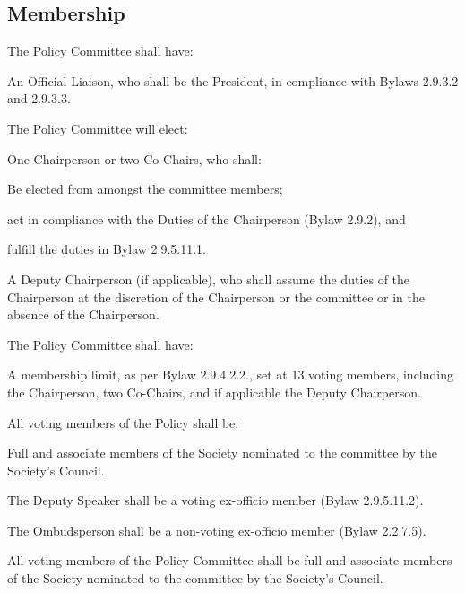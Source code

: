 \subsection{Membership}
\begin{longenum}[ label*=\thesubsection.\arabic*., align=left] 
\item The Policy Committee shall have:
	\begin{longenum}[label*=\arabic*., align=left]	
	\item An Official Liaison, who shall be the President, in compliance with Bylaws 2.9.3.2 and
2.9.3.3.
	\end{longenum}
\item The Policy Committee will elect:
	\begin{longenum}[label*=\arabic*., align=left]	
	\item One Chairperson or two Co-Chairs, who shall:
		\begin{longenum}[label*=\arabic*., align=left]	
		\item Be elected from amongst the committee members;
		\item act in compliance with the Duties of the Chairperson (Bylaw 2.9.2), and
		\item fulfill the duties in Bylaw 2.9.5.11.1.
		\end{longenum}
	\item A Deputy Chairperson (if applicable), who shall assume the duties of the Chairperson at the discretion of the Chairperson or the committee or in the absence of the Chairperson.
	\end{longenum}
\item The Policy Committee shall have:
	\begin{longenum}[label*=\arabic*., align=left]	
	\item A membership limit, as per Bylaw 2.9.4.2.2., set at 13 voting members, including the Chairperson, two Co-Chairs, and if applicable the Deputy Chairperson.
	\end{longenum}
\item All voting members of the Policy shall be:
	\begin{longenum}[label*=\arabic*., align=left]	
	\item Full and associate members of the Society nominated to the committee by the Society’s Council.
	\end{longenum}
\item The Deputy Speaker shall be a voting ex-officio member (Bylaw 2.9.5.11.2).
\item The Ombudsperson shall be a non-voting ex-officio member (Bylaw 2.2.7.5).
\item All voting members of the Policy Committee shall be full and associate members of the Society nominated to the committee by the Society’s Council. 
\end{longenum}

